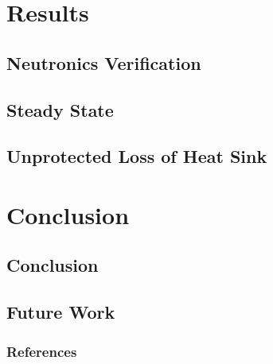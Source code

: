 \documentclass[9pt]{beamer}
\begin{document}
\section{Results}
\subsection{Neutronics Verification}

\subsection{Steady State}

\subsection{Unprotected Loss of Heat Sink}


\section{Conclusion}
\subsection{Conclusion}

\subsection{Future Work}

%
\begin{frame}[allowframebreaks]
  \frametitle{References}
  
  {\footnotesize  }

\end{frame}

\end{document}
